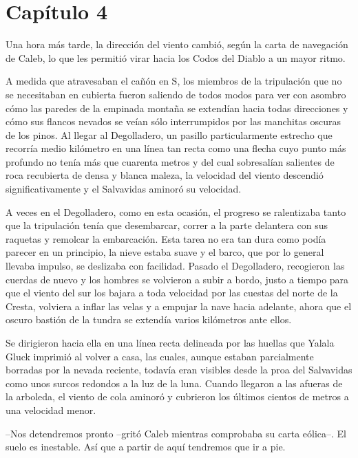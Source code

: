 \chapter*{Capítulo 4}

Una hora más tarde, la dirección del viento cambió, según la carta de navegación de Caleb, lo que les permitió virar hacia los Codos del Diablo a un mayor ritmo.
 
A medida que atravesaban el cañón en S, los miembros de la tripulación que no se necesitaban en cubierta fueron saliendo de todos modos para ver con asombro cómo las paredes de la empinada montaña se extendían hacia todas direcciones y cómo sus flancos nevados se veían sólo interrumpidos por las manchitas oscuras de los pinos. Al llegar al Degolladero, un pasillo particularmente estrecho que recorría medio kilómetro en una línea tan recta como una flecha cuyo punto más profundo no tenía más que cuarenta metros y del cual sobresalían salientes de roca recubierta de densa y blanca maleza, la velocidad del viento descendió significativamente y el Salvavidas aminoró su velocidad.
 
A veces en el Degolladero, como en esta ocasión, el progreso se ralentizaba tanto que la tripulación tenía que desembarcar, correr a la parte delantera con sus raquetas y remolcar la embarcación. Esta tarea no era tan dura como podía parecer en un principio, la nieve estaba suave y el barco, que por lo general llevaba impulso, se deslizaba con facilidad. Pasado el Degolladero, recogieron las cuerdas de nuevo y los hombres se volvieron a subir a bordo, justo a tiempo para que el viento del sur los bajara a toda velocidad por las cuestas del norte de la Cresta, volviera a inflar las velas y a empujar la nave hacia adelante, ahora que el oscuro bastión de la tundra se extendía varios kilómetros ante ellos.
 
Se dirigieron hacia ella en una línea recta delineada por las huellas que Yalala Gluck imprimió al volver a casa, las cuales, aunque estaban parcialmente borradas por la nevada reciente, todavía eran visibles desde la proa del Salvavidas como unos surcos redondos a la luz de la luna. Cuando llegaron a las afueras de la arboleda, el viento de cola aminoró y cubrieron los últimos cientos de metros a una velocidad menor.
 
--Nos detendremos pronto --gritó Caleb mientras comprobaba su carta eólica--. El suelo es inestable. Así que a partir de aquí tendremos que ir a pie.
 
